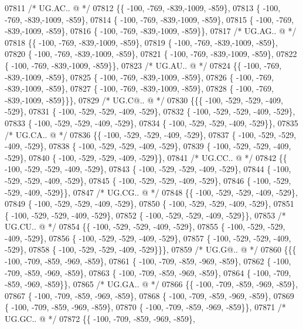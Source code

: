 \begin{DoxyCode}
07811 \textcolor{comment}{/* UG.AC.. @ */}
07812 \{\{ -100, -769, -839,-1009, -859\},
07813 \{ -100, -769, -839,-1009, -859\},
07814 \{ -100, -769, -839,-1009, -859\},
07815 \{ -100, -769, -839,-1009, -859\},
07816 \{ -100, -769, -839,-1009, -859\}\},
07817 \textcolor{comment}{/* UG.AG.. @ */}
07818 \{\{ -100, -769, -839,-1009, -859\},
07819 \{ -100, -769, -839,-1009, -859\},
07820 \{ -100, -769, -839,-1009, -859\},
07821 \{ -100, -769, -839,-1009, -859\},
07822 \{ -100, -769, -839,-1009, -859\}\},
07823 \textcolor{comment}{/* UG.AU.. @ */}
07824 \{\{ -100, -769, -839,-1009, -859\},
07825 \{ -100, -769, -839,-1009, -859\},
07826 \{ -100, -769, -839,-1009, -859\},
07827 \{ -100, -769, -839,-1009, -859\},
07828 \{ -100, -769, -839,-1009, -859\}\}\},
07829 \textcolor{comment}{/* UG.C@.. @ */}
07830 \{\{\{ -100, -529, -529, -409, -529\},
07831 \{ -100, -529, -529, -409, -529\},
07832 \{ -100, -529, -529, -409, -529\},
07833 \{ -100, -529, -529, -409, -529\},
07834 \{ -100, -529, -529, -409, -529\}\},
07835 \textcolor{comment}{/* UG.CA.. @ */}
07836 \{\{ -100, -529, -529, -409, -529\},
07837 \{ -100, -529, -529, -409, -529\},
07838 \{ -100, -529, -529, -409, -529\},
07839 \{ -100, -529, -529, -409, -529\},
07840 \{ -100, -529, -529, -409, -529\}\},
07841 \textcolor{comment}{/* UG.CC.. @ */}
07842 \{\{ -100, -529, -529, -409, -529\},
07843 \{ -100, -529, -529, -409, -529\},
07844 \{ -100, -529, -529, -409, -529\},
07845 \{ -100, -529, -529, -409, -529\},
07846 \{ -100, -529, -529, -409, -529\}\},
07847 \textcolor{comment}{/* UG.CG.. @ */}
07848 \{\{ -100, -529, -529, -409, -529\},
07849 \{ -100, -529, -529, -409, -529\},
07850 \{ -100, -529, -529, -409, -529\},
07851 \{ -100, -529, -529, -409, -529\},
07852 \{ -100, -529, -529, -409, -529\}\},
07853 \textcolor{comment}{/* UG.CU.. @ */}
07854 \{\{ -100, -529, -529, -409, -529\},
07855 \{ -100, -529, -529, -409, -529\},
07856 \{ -100, -529, -529, -409, -529\},
07857 \{ -100, -529, -529, -409, -529\},
07858 \{ -100, -529, -529, -409, -529\}\}\},
07859 \textcolor{comment}{/* UG.G@.. @ */}
07860 \{\{\{ -100, -709, -859, -969, -859\},
07861 \{ -100, -709, -859, -969, -859\},
07862 \{ -100, -709, -859, -969, -859\},
07863 \{ -100, -709, -859, -969, -859\},
07864 \{ -100, -709, -859, -969, -859\}\},
07865 \textcolor{comment}{/* UG.GA.. @ */}
07866 \{\{ -100, -709, -859, -969, -859\},
07867 \{ -100, -709, -859, -969, -859\},
07868 \{ -100, -709, -859, -969, -859\},
07869 \{ -100, -709, -859, -969, -859\},
07870 \{ -100, -709, -859, -969, -859\}\},
07871 \textcolor{comment}{/* UG.GC.. @ */}
07872 \{\{ -100, -709, -859, -969, -859\},

\end{DoxyCode}
